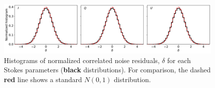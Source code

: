 \documentclass[twocolumn]{aa}%
\begin{document}
\begin{figure}[t]
    \begin{center}
        \includegraphics[width=\linewidth]{figs/map_corr_histogram_nils_v2.pdf}
    \end{center}
    \vspace*{-0.7cm}
    \caption{Histograms of normalized correlated noise residuals, $\delta$ for each Stokes parameters (\textbf{black} distributions).  For comparison, the dashed \textbf{red} line shows a standard $N(0,1)$ distribution.}
    \label{fig:corr_map_hist}
\end{figure}
\end{document}
